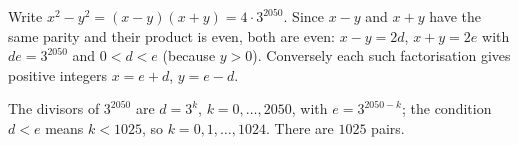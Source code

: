 Write $x^2-y^2=(x-y)(x+y)=4\cdot3^{2050}$. Since $x-y$ and $x+y$ have the same parity and their product is even, both are even: $x-y=2d$, $x+y=2e$ with $de=3^{2050}$ and $0<d<e$ (because $y>0$). Conversely each such factorisation gives positive integers $x=e+d$, $y=e-d$.

The divisors of $3^{2050}$ are $d=3^k$, $k=0,\dots,2050$, with $e=3^{2050-k}$; the condition $d<e$ means $k<1025$, so $k=0,1,\dots,1024$. There are $\boxed{1025}$ pairs.
